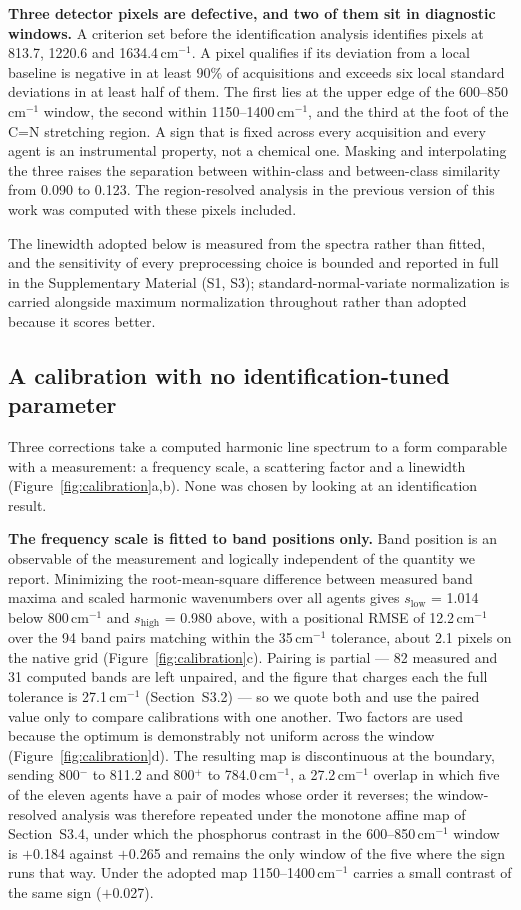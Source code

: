 \documentclass[review,12pt]{elsarticle}
\newcommand*\wn{\ensuremath{\text{cm}^{-1}}}
\begin{document}
\textbf{Three detector pixels are defective, and two of them sit in diagnostic windows.}
A criterion set before the identification analysis identifies pixels at 813.7, 1220.6
and 1634.4\,\wn{}. A pixel qualifies if its deviation from a local baseline is negative
in at least 90\% of acquisitions and exceeds six local standard deviations in at least
half of them. The first lies at the upper edge of the 600--850\,\wn{} window, the
second within 1150--1400\,\wn{}, and the third at the foot of the C=N
stretching region. A sign that is fixed across every acquisition and every agent is an
instrumental property, not a chemical one. Masking and interpolating the three raises the separation between within-class and between-class similarity from 0.090 to 0.123.
The region-resolved analysis in the previous version of this work was computed with
these pixels included.



The linewidth adopted below is measured from the spectra rather than fitted, and the sensitivity of every preprocessing choice is bounded and reported in full in the Supplementary Material (S1, S3); standard-normal-variate normalization is carried alongside maximum normalization throughout rather than adopted because it scores better.
\subsection{A calibration with no identification-tuned parameter}

Three corrections take a computed harmonic line spectrum to a form comparable with a
measurement: a frequency scale, a scattering factor and a linewidth
(Figure~\ref{fig:calibration}a,b). None was chosen by looking at an identification result.

\textbf{The frequency scale is fitted to band positions only.} Band position is an
observable of the measurement and logically independent of the quantity we report.
Minimizing the root-mean-square difference between measured band maxima and scaled harmonic
wavenumbers over all agents gives $s_{\mathrm{low}}$ = 1.014 below 800\,\wn{} and
$s_{\mathrm{high}}$ = 0.980 above, with a positional RMSE of 12.2\,\wn{} over the 94 band
pairs matching within the 35\,\wn{} tolerance, about 2.1 pixels on the native grid
(Figure~\ref{fig:calibration}c). Pairing is partial --- 82 measured and 31 computed bands
are left unpaired, and the figure that charges each the full tolerance is 27.1\,\wn{}
(Section~S3.2) --- so we quote both and use the paired value only to compare calibrations
with one another. Two factors are used because the optimum is demonstrably not uniform
across the window (Figure~\ref{fig:calibration}d). The resulting map is discontinuous at
the boundary, sending 800$^-$ to 811.2 and 800$^+$ to 784.0\,\wn{}, a 27.2\,\wn{} overlap
in which five of the eleven agents have a pair of modes whose order it reverses; the
window-resolved analysis was therefore repeated under the monotone affine map of
Section~S3.4, under which the phosphorus contrast in the 600--850\,\wn{} window is
$+$0.184 against $+$0.265 and remains the only window of the five where the sign runs that
way. Under the adopted map 1150--1400\,\wn{} carries a small contrast of the same sign
($+$0.027).
\end{document}
